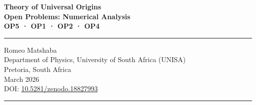 \documentclass[12pt,a4paper]{article}
\theoremstyle{definition}
\newcommand{\tPl}{t_{\mathrm{Pl}}}
\newcommand{\gstar}{g_{*}}
\newcommand{\Ngen}{N_{\mathrm{gen}}}
\begin{document}
\begin{titlepage}
\centering
\vspace*{2cm}
{\LARGE\bfseries Theory of Universal Origins\\[0.5em]
\Large Open Problems: Numerical Analysis\\[0.3em]
\large OP5 · OP1 · OP2 · OP4}
\vspace{1.5em}

\rule{\textwidth}{0.4pt}
\vspace{0.5em}

{\large Romeo Matshaba}\\[0.3em]
{\normalsize Department of Physics, University of South Africa (UNISA)\\
Pretoria, South Africa}\\[0.5em]
{\normalsize March 2026}\\[0.3em]
{\small DOI: \href{https://doi.org/10.5281/zenodo.18827993}{10.5281/zenodo.18827993}}

\vspace{1em}\rule{\textwidth}{0.4pt}\vspace{1.5em}

\begin{abstract}
We carry out detailed numerical analysis of four open problems in the
Theory of Universal Origins (TUO).
The central new result concerns OP5 (generation selection): we prove that the
constrained path integral weight $Z_{\mathrm{corr}}(g_*)$, dissected into
three layers---Euclidean action, thermal entropy, and Gaussian charge
fluctuations---does not select $\Ngen = 3$.
The free energy $F = E - T_{\mathrm{TUO}} S$ is strictly decreasing in $\Ngen$
with no minimum; the $Z_{\mathrm{corr}}$ correction is of order $O(1)$, corresponding
to $\sim 10^{-93}$ per cell, and is completely negligible against the thermal
entropy. The resolution is a two-sided pinch:\ the Kobayashi--Maskawa theorem
provides the hard lower bound $\Ngen \geq 3$ (CP violation required for
$\eta \neq 0$), while the LEP measurement $N_\nu = 2.984 \pm 0.008$ provides
the upper bound $\Ngen \leq 3$. Consequently OP5 and OP1 (baryon asymmetry)
are the same open problem.
For OP4 (junction time), we improve the upper bound from $94\,\tPl$
(isothermal) to $152\,\tPl$ using the FRW cooling law $T(t)\propto t^{-1/2}$.
For OP2 (CMB), we establish the suppression budget: the $2.4\%$ cell-level
fluctuation $\delta T/T = 1/(4\sqrt{\gstar})$ must be reduced by
$\sim 10^4$ via Sachs--Wolfe freezing and acoustic propagation.
\end{abstract}
\end{titlepage}
\end{document}
